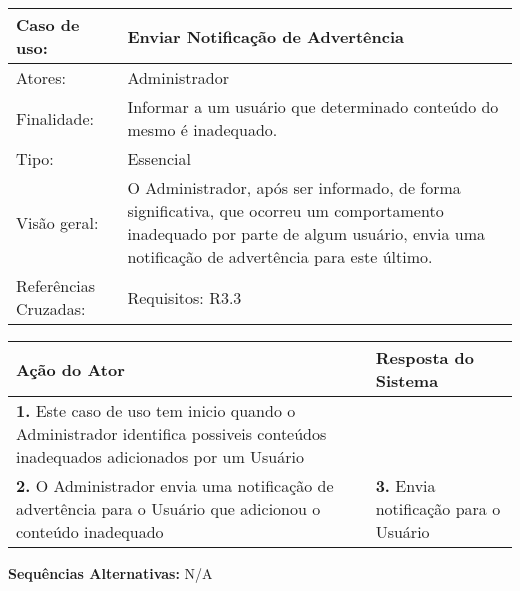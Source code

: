 \documentclass[12pt,a4paper,onecolumn,titlepage]{article}
\begin{document}
\begin{table}[h!]
\begin{center}
\begin{tabular}{p{2.5cm} p{9.5cm}}
Caso de uso: & \textbf{Enviar Notificação de Advertência} \\ \hline
Atores: & Administrador \\ \hline
Finalidade: & Informar a um usuário que determinado conteúdo do mesmo é inadequado.\\ \hline
Tipo: & Essencial \\ \hline
Visão geral: & O Administrador, após ser informado, de forma significativa, que ocorreu um comportamento inadequado por parte de algum usuário, envia uma notificação de advertência para este último. \\ \hline
Referências Cruzadas: & Requisitos: R3.3\\ 

\end{tabular}
\end{center}
\end{table}

\begin{center}
\def\arraystretch{1.1}
\begin{tabular}{|p{6cm}|p{6cm}|}

\hline
\textbf{Ação do Ator} & \textbf{Resposta do Sistema} \\ \hline
\textbf{1.} Este caso de uso tem inicio quando o Administrador identifica possiveis conteúdos inadequados adicionados por um Usuário  & \\ \hline
\textbf{2.} O Administrador envia uma notificação de advertência para o Usuário que adicionou o conteúdo inadequado  & \textbf{3.} Envia notificação para o Usuário \\ \hline
\end{tabular}
\end{center}

\textbf{Sequências Alternativas:} N/A
\end{document}
